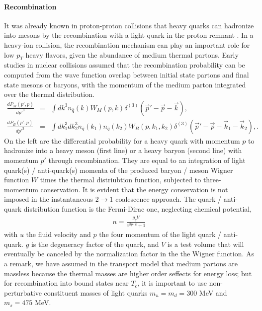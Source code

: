 \paragraph{Recombination}
It was already known in proton-proton collisions that heavy quarks can hadronize into mesons by the recombination with a light quark in the proton remnant \cite{Mehen:2003rf}.
In a heavy-ion collision, the recombination mechanism can play an important role for low $p_T$ heavy flavors, given the abundance of medium thermal partons.
Early studies in nuclear collisions \cite{Oh:2009zj} assumed that the recombination probability can be computed from the wave function overlap between initial state partons and final state mesons or baryons, with the momentum of the medium parton integrated over the thermal distribution.
\begin{eqnarray}
\frac{dP_M(p', p)}{dp'^3} &=& \int dk^3 n_{\bar{q}}(k) W_{M}(p, k)\delta^{(3)}(\vec{p}'-\vec{p}-\vec{k}), \label{eq:meson_recombine}\\
\frac{dP_B(p', p)}{dp'^3} &=& \int dk_1^3 dk_2^3 n_{\bar{q}}(k_1)  n_{\bar{q}}(k_2) W_{B}(p, k_1, k_2)\delta^{(3)}(\vec{p}'-\vec{p}-\vec{k}_1 - \vec{k}_2), \label{eq:baryon_recombine}.
\end{eqnarray}
On the left are the differential probability for a heavy quark with momentum $p$ to hadronize into a heavy meson (first line) or a heavy baryon (second line) with momentum $p'$ through recombination.
They are equal to an integration of light quark(s) / anti-quark(s) momenta of the produced baryon / meson Wigner function $W$ times the thermal distriubtion function, subjected to three-momentum conservation.
It is evident that the energy conservation is not imposed in the instantaneous $2\rightarrow 1$ coalescence approach.
The quark / anti-quark distribution function is the Fermi-Dirac one, neglecting chemical potential, 
\begin{eqnarray}
n = \frac{g_q V}{e^{\beta p\cdot u} + 1}
\end{eqnarray}
with $u$ the fluid velocity and $p$ the four momentum of the light quark / anti-quark.
$g$ is the degeneracy factor of the quark, and $V$ is a test volume that will eventually be canceled by the normalization factor in the the Wigner function.
As a remark, we have assumed in the transport model that medium partons are massless because the thermal masses are higher order seffects for energy loss; but for recombination into bound states near $T_c$, it is important to use non-perturbative constituent masses of light quarks $m_u = m_d = 300$ MeV and $m_s = 475$ MeV.

